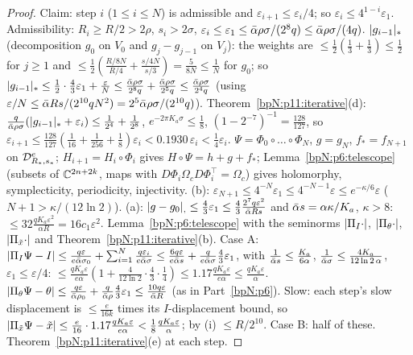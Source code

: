 \begin{proof}
\label{stepN:p11:nf-induct} Claim: step $i$ ($1\le i\le N$) is admissible and $\varepsilon_{i+1}\le\varepsilon_i/4$; so $\varepsilon_i\le4^{1-i}\varepsilon_1$. Admissibility: $R_i\ge R/2>2\rho$, $s_i>2\sigma$, $\varepsilon_i\le\varepsilon_1\le\bar\alpha\rho\sigma/(2^8q)\le\bar\alpha\rho\sigma/(4q)$. $\lvert g_{i-1}\rvert_*$ (decomposition $g_0$ on $V_0$ and $g_j-g_{j-1}$ on $V_j$): the weights are $\le\frac12(\frac13+\frac13)\le\frac12$ for $j\ge1$ and $\le\frac12(\frac{R/8N}{R/4}+\frac{s/4N}{s/3})=\frac5{8N}\le\frac1N$ for $g_0$; so $\lvert g_{i-1}\rvert_*\le\frac12\cdot\frac43\varepsilon_1+\frac\varepsilon N\le\frac{\bar\alpha\rho\sigma}{2^8q}+\frac{\bar\alpha\rho\sigma}{2^5q}\le\frac{\bar\alpha\rho\sigma}{2^4q}$ (using $\varepsilon/N\le\bar\alpha Rs/(2^{10}qN^2)=2^5\bar\alpha\rho\sigma/(2^{10}q)$). Theorem~\ref{bpN:p11:iterative}(d): $\frac q{\bar\alpha\rho\sigma}(\lvert g_{i-1}\rvert_*+\varepsilon_i)\le\frac1{2^4}+\frac1{2^8}$, $e^{-2\pi K_a\sigma}\le\frac18$, $(1-2^{-7})^{-1}=\frac{128}{127}$, so $\varepsilon_{i+1}\le\frac{128}{127}(\frac1{16}+\frac1{256}+\frac18)\varepsilon_i<0.1930\,\varepsilon_i<\frac14\varepsilon_i$.
\label{stepN:p11:nf-concl} $\Psi=\Phi_0\circ\dots\circ\Phi_N$, $g=g_N$, $f_*=f_{N+1}$ on $\mathcal D_{R_*,s_*}^e$; $H_{i+1}=H_i\circ\Phi_i$ gives $H\circ\Psi=h+g+f_*$; Lemma~\ref{bpN:p6:telescope} (subsets of $\mathbb{C}^{2n+2k}$, maps with $D\Phi_i\Omega_cD\Phi_i^\top=\Omega_c$) gives holomorphy, symplecticity, periodicity, injectivity. (b): $\varepsilon_{N+1}\le4^{-N}\varepsilon_1\le4^{-N-1}\varepsilon\le e^{-\kappa/6}\varepsilon$ ($N+1>\kappa/(12\ln2)$). (a): $\lvert g-g_0\rvert_{,}\le\frac43\varepsilon_1\le\frac43\frac{2^7q\varepsilon^2}{\bar\alpha Rs}$ and $\bar\alpha s=\alpha\kappa/K_a$, $\kappa>8$: $\le32\frac{qK_a\varepsilon^2}{\alpha R}=16c_1\varepsilon^2$.
\label{stepN:p11:nf-disp} Lemma~\ref{bpN:p6:telescope} with the seminorms $\lvert \Pi_I\cdot\rvert$, $\lvert \Pi_\theta\cdot\rvert$, $\lvert \Pi_{\tilde x}\cdot\rvert$ and Theorem~\ref{bpN:p11:iterative}(b). Case A: $\lvert \Pi_I\Psi-I\rvert\le\frac{q\varepsilon}{e\bar\alpha\sigma_0}+\sum_{i=1}^N\frac{q\varepsilon_i}{e\bar\alpha\sigma}\le\frac{6q\varepsilon}{e\bar\alpha s}+\frac q{e\bar\alpha\sigma}\frac43\varepsilon_1$, with $\frac1{\bar\alpha s}\le\frac{K_a}{6\alpha}$, $\frac1{\bar\alpha\sigma}\le\frac{4K_a}{12\ln2\,\alpha}$, $\varepsilon_1\le\varepsilon/4$: $\le\frac{qK_a\varepsilon}{e\alpha}(1+\frac4{12\ln2}\cdot\frac43\cdot\frac14)\le1.17\frac{qK_a\varepsilon}{e\alpha}\le\frac{qK_a\varepsilon}\alpha$. $\lvert \Pi_\theta\Psi-\theta\rvert\le\frac{q\varepsilon}{\bar\alpha\rho_0}+\frac q{\bar\alpha\rho}\frac43\varepsilon_1\le\frac{10q\varepsilon}{\bar\alpha R}$ (as in Part~\ref{bpN:p6}). Slow: each step's slow displacement is $\le\frac e{16k}$ times its $I$-displacement bound, so $\lvert \Pi_{\tilde x}\Psi-\tilde x\rvert\le\frac e{16}\cdot1.17\frac{qK_a\varepsilon}{e\alpha}<\frac18\frac{qK_a\varepsilon}\alpha$; by (i) $\le R/2^{10}$. Case B: half of these.
\label{stepN:p11:nf-real} Theorem~\ref{bpN:p11:iterative}(e) at each step.
\end{proof}
\endgroup
